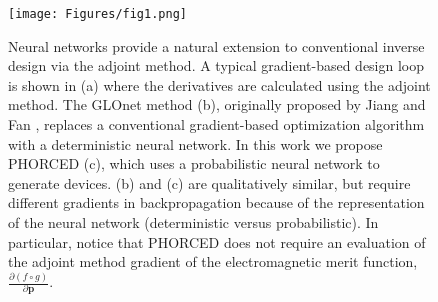 \documentclass{article}
\begin{document}
\begin{figure}[t!]
	\centering
	\texttt{[image: Figures/fig1.png]}
	\caption{Neural networks provide a natural extension to conventional inverse design via the adjoint method. A typical gradient-based design loop is shown in (a) where the derivatives are calculated using the adjoint method. The GLOnet method (b), originally proposed by Jiang and Fan \cite{jiang_global_2019,jiang_simulator-based_2020}, replaces a conventional gradient-based optimization algorithm with a deterministic neural network. In this work we propose PHORCED (c), which uses a probabilistic neural network to generate devices. (b) and (c) are qualitatively similar, but require different gradients in backpropagation because of the representation of the neural network (deterministic versus probabilistic). In particular, notice that PHORCED does not require an evaluation of the adjoint method gradient of the electromagnetic merit function, $\frac{\partial (f\circ g)}{\partial \mathbf{p}}$.}
	\label{fig:fig1}
\end{figure}
\end{document}
